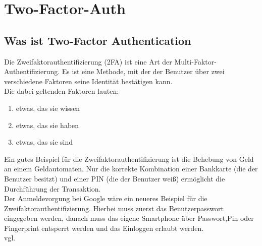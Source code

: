 \section{Two-Factor-Auth}
\label{sec:2fa}
\subsection{Was ist Two-Factor Authentication}
Die Zweifaktorauthentifizierung (2FA) ist eine Art der Multi-Faktor-Authentifizierung. Es ist eine Methode, mit der der Benutzer über zwei verschiedene Faktoren seine Identität bestätigen kann.\\
Die dabei geltenden Faktoren lauten:
\begin{enumerate}
\item etwas, das sie wissen
\item etwas, das sie haben
\item etwas, das sie sind
\end{enumerate}
Ein gutes Beispiel für die Zweifaktorauthentifizierung ist die Behebung von Geld an einem Geldautomaten. Nur die korrekte Kombination einer Bankkarte (die der Benutzer besitzt) und einer PIN (die der Benutzer weiß) ermöglicht die Durchführung der Transaktion.\\Der Anmeldevorgung bei Google wäre ein neueres Beispiel für die Zweifaktorauthentifizierung. Hierbei muss zuerst das Benutzerpasswort eingegeben werden, danach muss das eigene Smartphone über Passwort,Pin oder Fingerprint entsperrt werden und das Einloggen erlaubt werden. 
\\ vgl. \textcite{2FA}
